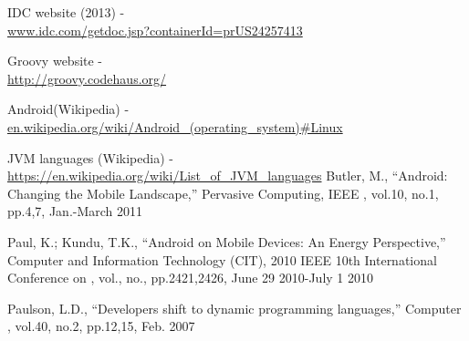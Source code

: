\documentclass{sig-alternate}
\def \ANDROID{Android\xspace}
\def \JVM{JVM\xspace}
\begin{document}
\begin{thebibliography}{}

  IDC website (2013) - \\ \url{www.idc.com/getdoc.jsp?containerId=prUS24257413}

  Groovy website - \\ \url{http://groovy.codehaus.org/}
  
  \ANDROID (Wikipedia) - \\ \url{en.wikipedia.org/wiki/Android\_(operating\_system)#Linux}

  \JVM languages (Wikipedia) - \\ \url{https://en.wikipedia.org/wiki/List\_of\_JVM\_languages}
   Butler, M., ``Android: Changing the Mobile Landscape,'' Pervasive Computing, IEEE , vol.10, no.1, pp.4,7, Jan.-March 2011

  Paul, K.; Kundu, T.K., ``Android on Mobile Devices: An Energy Perspective,'' Computer and Information Technology (CIT), 2010 IEEE 10th International Conference on , vol., no., pp.2421,2426, June 29 2010-July 1 2010

  Paulson, L.D., ``Developers shift to dynamic programming languages,'' Computer , vol.40, no.2, pp.12,15, Feb. 2007


\end{thebibliography}
\end{document}
